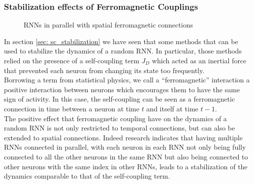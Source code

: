 \documentclass[a4paper,12pt]{report}
\begin{document}
\subsubsection*{Stabilization effects of Ferromagnetic Couplings}

\begin{figure}[h!] %
    \centering
    \caption{RNNs in parallel with spatial ferromagnetic connections}
    \label{fig:diagram_spatial_ferromagnetic}
\end{figure}

In section \ref{sec: sc_stabilization} we have seen that some methods that can be used to stabilize the 
dynamics of a random RNN. In particular, those methods relied on the presence of a self-coupling term
$J_D$ which acted as an inertial force that prevented each neuron from changing its state too 
frequently. \\
Borrowing a term from statistical physics, we call a ``ferromagnetic'' interaction a positive 
interaction between neurons which encourages them to have the same sign of activity. 
In this case, the self-coupling can be seen as a ferromagnetic connection in time between a neuron at 
time $t$ and itself at time $t-1$. \\
The positive effect that ferromagnetic coupling have on the dynamics of a random RNN is not only 
restricted to temporal connections, but can also be extended to spatial connections. Indeed research 
indicates that having multiple RNNs connected in parallel, with each neuron in each RNN not only 
being fully connected to all the other neurons in the same RNN but also being connected to other 
neurons with the same index in other RNNs, leads to a stabilization of the dynamics comparable to
that of the self-coupling term.
\end{document}
